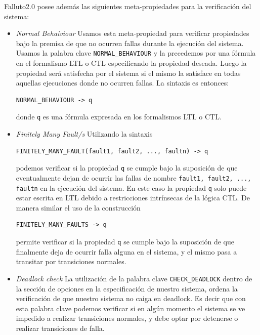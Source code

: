 \documentclass[titlepage, 12pt]{book}
\begin{document}
Falluto2.0 posee adem\'as las siguientes meta-propiedades para la verificaci\'on del sistema:
\begin{itemize}
\item \textit{Normal Behaiviour} Usamos esta meta-propiedad para verificar propiedades bajo la premisa de que no ocurren fallas durante la ejecuci\'on del sistema. Usamos la palabra clave \texttt{NORMAL\_BEHAVIOUR} y la precedemos por una f\'ormula en el formalismo LTL o CTL especificando la propiedad deseada. Luego la propiedad ser\'a satisfecha por el sistema si el mismo la satisface en todas aquellas ejecuciones donde no ocurren fallas. La sintaxis es entonces: \begin{verbatim}NORMAL_BEHAVIOUR -> q \end{verbatim} donde \texttt{q} es una f\'ormula expresada en los formalismos LTL o CTL.
\item \textit{Finitely Many Fault/s} Utilizando la sintaxis \begin{verbatim}FINITELY_MANY_FAULT(fault1, fault2, ..., faultn) -> q\end{verbatim} podemos verificar si la propiedad \texttt{q} se cumple bajo la suposici\'on de que eventualmente dejan de ocurrir las fallas de nombre \texttt{fault1, fault2, ..., faultn} en la ejecuci\'on del sistema. En este caso la propiedad \texttt{q} solo puede estar escrita en LTL debido a restricciones intr\'insecas de la l\'ogica CTL. De manera similar el uso de la construcci\'on \begin{verbatim}FINITELY_MANY_FAULTS -> q \end{verbatim} permite verificar si la propiedad \texttt{q} se cumple bajo la suposici\'on de que finalmente deja de ocurrir falla alguna en el sistema, y el mismo pasa a transitar por transiciones normales.
\item \textit{Deadlock check} La utilizaci\'on de la palabra clave \texttt{CHECK\_DEADLOCK} dentro de la secci\'on de opciones en la especificaci\'on de nuestro sistema, ordena la verificaci\'on de que nuestro sistema no caiga en deadlock. Es decir que con esta palabra clave podemos verificar si en alg\'un momento el sistema se ve impedido a realizar transiciones normales, y debe optar por detenerse o realizar transiciones de falla.
\end{itemize}
\end{document}
